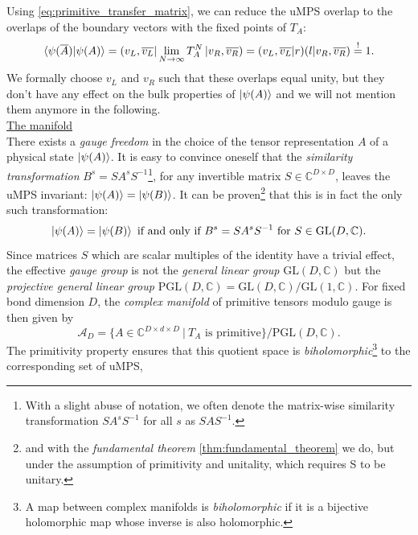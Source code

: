 \noindent Using \eqref{eq:primitive_transfer_matrix}, we can reduce the uMPS overlap to the overlaps of the boundary vectors with the fixed points of $T_A$:
\begin{equation}
	\langle \psi (\overline{A}) \vert \psi (A) \rangle = \left( v_L, \overline{v_L} \right| \lim_{N \to \infty} T_A^{N} \left| v_R, \overline{v_R} \right) = ( v_L, \overline{v_L} \vert r ) ( l \vert v_R, \overline{v_R} ) \overset{!}{=} 1.
\end{equation}
We formally choose $v_L$ and $v_R$ such that these overlaps equal unity, but they don't have any effect on the bulk properties of $\ket{\psi (A)}$ and we will not mention them anymore in the following. \\[1em]

\noindent \underline{The manifold} \\[0.5em]
\noindent There exists a \textit{gauge freedom} in the choice of the tensor representation $A$ of a physical state $\ket{\psi (A)}$. It is easy to convince oneself that the \textit{similarity transformation} $B^s = S A^s S^{-1}$\footnote{With a slight abuse of notation, we often denote the matrix-wise similarity transformation $S A^s S^{-1}$ for all $s$ as $S A S^{-1}$.}, for any invertible matrix $S \in \mathbb{C}^{D \times D}$, leaves the uMPS invariant: $\ket{\psi (A)} = \ket{\psi (B)}$. It can be proven\footnote{and with the \textit{fundamental theorem} \ref{thm:fundamental_theorem} we do, but under the assumption of primitivity and unitality, which requires S to be unitary.} that this is in fact the only such transformation:
\begin{equation} \label{eq:umps_gauge}
	\ket{\psi (A)} = \ket{\psi (B)} \text{ if and only if } B^s = S A^s S^{-1} \text{ for } S \in \mathrm{GL}(D, \mathbb{C}).
\end{equation}
Since matrices $S$ which are scalar multiples of the identity have a trivial effect, the effective \textit{gauge group} is not the \textit{general linear group} $\mathrm{GL}(D, \mathbb{C})$ but the \textit{projective general linear group} $\mathrm{PGL}(D, \mathbb{C}) = \mathrm{GL}(D, \mathbb{C}) / \mathrm{GL}(1, \mathbb{C})$. For fixed bond dimension $D$, the \textit{complex manifold} of primitive tensors modulo gauge is then given by
\begin{equation}
	\mathcal{A}_D = \{A \in \mathbb{C}^{D \times d \times D} \: \vert \: T_A \text{ is primitive} \} / \mathrm{PGL}(D, \mathbb{C}). 
\end{equation}
The primitivity property ensures that this quotient space is \textit{biholomorphic}\footnote{A map between complex manifolds is \textit{biholomorphic} if it is a bijective holomorphic map whose inverse is also holomorphic.} to the corresponding set of uMPS,
